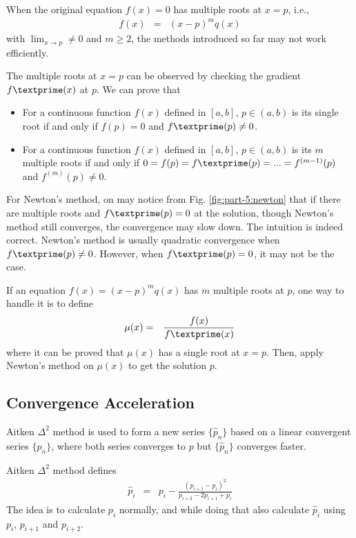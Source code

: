 When the original equation $f(x)=0$ has multiple roots at $x=p$, i.e.,
\begin{eqnarray}
  f(x) &=& (x-p)^mq(x) \nonumber
\end{eqnarray}
with $\lim_{x\rightarrow p} \neq 0$ and $m\geq 2$, the methods introduced so far may not work efficiently.

The multiple roots at $x=p$ can be observed by checking the gradient $f\textprime(x)$ at $p$. We can prove that
\begin{itemize}
  \item For a continuous function $f(x)$ defined in $[a, b]$, $p\in(a,b)$ is its single root if and only if $f(p)=0$ and $f\textprime(p)\neq 0$.
  \item For a continuous function $f(x)$ defined in $[a, b]$, $p\in(a,b)$ is its $m$ multiple roots if and only if $0=f(p)=f\textprime(p)=...=f^{(m-1)}(p)$ and $f^{(m)}(p)\neq 0$.
\end{itemize}

For Newton's method, on may notice from Fig. \ref{fig:part-5:newton} that if there are multiple roots and $f\textprime(p)=0$ at the solution, though Newton's method still converges, the convergence may slow down. The intuition is indeed correct. Newton's method is usually quadratic convergence when $f\textprime(p)\neq 0$. However, when $f\textprime(p)=0$, it may not be the case.

If an equation $f(x)=(x-p)^mq(x)$ has $m$ multiple roots at $p$, one way to handle it is to define
\begin{eqnarray}
  \mu(x) &=& \frac{f(x)}{f\textprime (x)} \nonumber
\end{eqnarray}
where it can be proved that $\mu(x)$ has a single root at $x=p$. Then, apply Newton's method on $\mu(x)$ to get the solution $p$. 

\subsection{Convergence Acceleration}

Aitken $\Delta^2$ method is used to form a new series $\{\hat{p}_n\}$ based on a linear convergent series $\{p_n\}$, where both series converges to $p$ but $\{\hat{p}_n\}$ converges faster. 

Aitken $\Delta^2$ method defines
\begin{eqnarray}
  \hat{p}_i &=& p_i - \frac{(p_{i+1}-p_i)^2}{p_{i+2}-2p_{i+1}+p_i} \nonumber
\end{eqnarray}
The idea is to calculate $p_i$ normally, and while doing that also calculate $\hat{p}_i$ using $p_i$, $p_{i+1}$ and $p_{i+2}$.

